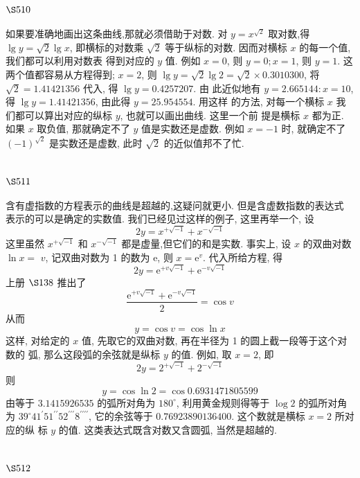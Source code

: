 \section{$\S 510$}

如果要准确地画出这条曲线,那就必须借助于对数. 对 $y=x^{\sqrt{2}}$ 取对数,得 $\lg y=\sqrt{2} \lg x$, 即横标的对数乘 $\sqrt{2}$ 等于纵标的对数. 因而对横标 $x$ 的每一个值, 我们都可以利用对数表 得到对应的 $y$ 值. 例如 $x=0$, 则 $y=0 ; x=1$, 则 $y=1$. 这两个值都容易从方程得到; $x=2$, 则 $\lg y=\sqrt{2} \lg 2=\sqrt{2} \times 0.3010300$, 将 $\sqrt{2}=1.41421356$ 代入, 得 $\lg y=0.4257207$. 由 此近似地有 $y=2.665144: x=10$, 得 $\lg y=1.41421356$, 由此得 $y=25.954554$. 用这样 的方法, 对每一个横标 $x$ 我们都可以算出对应的纵标 $y$, 也就可以画出曲线. 这里一个前 提是横标 $x$ 都为正. 如果 $x$ 取负值, 那就确定不了 $y$ 值是实数还是虚数. 例如 $x=-1$ 时, 就确定不了 $(-1)^{\sqrt{2}}$ 是实数还是虚数, 此时 $\sqrt{2}$ 的近似值邦不了忙.

\section{$\S 511$}

含有虚指数的方程表示的曲线是超越的,这疑问就更小. 但是含虚数指数的表达式 表示的可以是确定的实数值. 我们已经见过这样的例子, 这里再举一个, 设
\[
2 y=x^{+\sqrt{-1}}+x^{-\sqrt{-1}}
\]
这里虽然 $x^{+\sqrt{-1}}$ 和 $x^{-\sqrt{-1}}$ 都是虚量,但它们的和是实数. 事实上, 设 $x$ 的双曲对数 $\ln x=$ $v$, 记双曲对数为 1 的数为 $\mathrm{e}$, 则 $x=\mathrm{e}^{v}$. 代入所给方程, 得
\[
2 y=\mathrm{e}^{+v \sqrt{-1}}+\mathrm{e}^{-v \sqrt{-1}}
\]
上册 $\S 138$ 推出了
\[
\frac{\mathrm{e}^{+v \sqrt{-1}}+\mathrm{e}^{-v \sqrt{-1}}}{2}=\cos v
\]
从而
\[
y=\cos v=\cos \ln x
\]
这样, 对给定的 $x$ 值, 先取它的双曲对数, 再在半径为 1 的圆上截一段等于这个对数的 弧, 那么这段弧的余弦就是纵标 $y$ 的值. 例如, 取 $x=2$, 即
\[
2 y=2^{+\sqrt{-1}}+2^{-\sqrt{-1}}
\]
则
\[
y=\cos \ln 2=\cos 0.6931471805599
\]
由等于 $3.1415926535$ 的弧所对角为 $180^{\circ}$, 利用黄金规则得等于 $\log 2$ 的弧所对角为 $39^{\circ} 41^{\prime} 51^{\prime \prime} 52^{\prime \prime \prime} 8^{\prime \prime \prime \prime}$, 它的余弦等于 $0.76923890136400$. 这个数就是横标 $x=2$ 所对应的纵 标 $y$ 的值. 这类表达式既含对数又含圆弧, 当然是超越的.

\section{$\S 512$}

